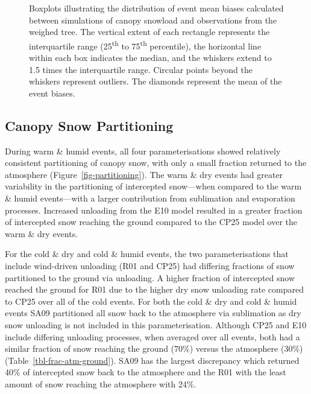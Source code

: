 \documentclass[
]{agujournal2019}
\makeatletter
\newcommand*\pandocbounded[1]{%
  \sbox\pandoc@box{#1}%
  \Gscale@div\@tempa{\textheight}{\dimexpr\ht\pandoc@box+\dp\pandoc@box\relax}%
  \Gscale@div\@tempb{\linewidth}{\wd\pandoc@box}%
  \ifdim\@tempb\p@<\@tempa\p@\let\@tempa\@tempb\fi%
  \ifdim\@tempa\p@<\p@\scalebox{\@tempa}{\usebox\pandoc@box}%
  \else\usebox{\pandoc@box}%
  \fi%
}
\makeatother
\begin{document}
\begin{figure}[htbp]

\centering{

\pandocbounded{\texttt{[image: figs/final/figure10.png]}}

}

\caption{\label{fig-cpy-load-mb-boxplot}Boxplots illustrating the
distribution of event mean biases calculated between simulations of
canopy snowload and observations from the weighed tree. The vertical
extent of each rectangle represents the interquartile range
(25\textsuperscript{th} to 75\textsuperscript{th} percentile), the
horizontal line within each box indicates the median, and the whiskers
extend to 1.5 times the interquartile range. Circular points beyond the
whiskers represent outliers. The diamonds represent the mean of the
event biases.}

\end{figure}%

\subsection{Canopy Snow Partitioning}\label{canopy-snow-partitioning}

During warm \& humid events, all four parameterisations showed
relatively consistent partitioning of canopy snow, with only a small
fraction returned to the atmosphere (Figure~\ref{fig-partitioning}). The
warm \& dry events had greater variability in the partitioning of
intercepted snow---when compared to the warm \& humid events---with a
larger contribution from sublimation and evaporation processes.
Increased unloading from the E10 model resulted in a greater fraction of
intercepted snow reaching the ground compared to the CP25 model over the
warm \& dry events.

For the cold \& dry and cold \& humid events, the two parameterisations
that include wind-driven unloading (R01 and CP25) had differing
fractions of snow partitioned to the ground via unloading. A higher
fraction of intercepted snow reached the ground for R01 due to the
higher dry snow unloading rate compared to CP25 over all of the cold
events. For both the cold \& dry and cold \& humid events SA09
partitioned all snow back to the atmosphere via sublimation as dry snow
unloading is not included in this parameterisation. Although CP25 and
E10 include differing unloading processes, when averaged over all
events, both had a similar fraction of snow reaching the ground (70\%)
versus the atmosphere (30\%) (Table~\ref{tbl-frac-atm-ground}). SA09 has
the largest discrepancy which returned 40\% of intercepted snow back to
the atmosphere and the R01 with the least amount of snow reaching the
atmosphere with 24\%.
\end{document}
